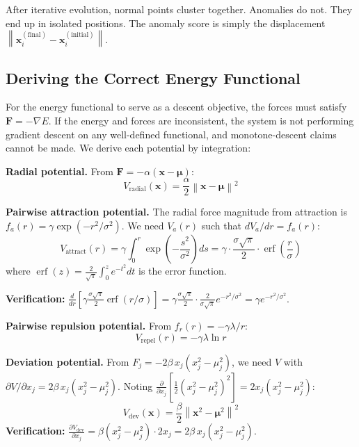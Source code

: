 \documentclass{article}
\newcommand{\norm}[1]{\left\lVert#1\right\rVert}
\DeclareMathOperator{\erf}{erf}
\begin{document}
After iterative evolution, normal points cluster together. Anomalies do not. They end up in isolated positions. The anomaly score is simply the displacement $\norm{\mathbf{x}_i^{(\text{final})} - \mathbf{x}_i^{(\text{initial})}}$.

\subsection{Deriving the Correct Energy Functional}

For the energy functional to serve as a descent objective, the forces must satisfy $\mathbf{F} = -\nabla E$. If the energy and forces are inconsistent, the system is not performing gradient descent on any well-defined functional, and monotone-descent claims cannot be made. We derive each potential by integration:

\textbf{Radial potential.} From $\mathbf{F} = -\alpha(\mathbf{x} - \bm{\mu})$:
\begin{equation}
V_{\text{radial}}(\mathbf{x}) = \frac{\alpha}{2}\norm{\mathbf{x} - \bm{\mu}}^2
\label{eq:v_radial}
\end{equation}

\textbf{Pairwise attraction potential.} The radial force magnitude from attraction is $f_a(r) = \gamma\exp(-r^2/\sigma^2)$. We need $V_a(r)$ such that $dV_a/dr = f_a(r)$:
\begin{equation}
V_{\text{attract}}(r) = \gamma \int_0^r \exp\!\left(-\frac{s^2}{\sigma^2}\right) ds = \gamma \cdot \frac{\sigma\sqrt{\pi}}{2} \cdot \erf\!\left(\frac{r}{\sigma}\right)
\label{eq:v_attract}
\end{equation}
where $\erf(z) = \frac{2}{\sqrt{\pi}}\int_0^z e^{-t^2} dt$ is the error function.

\textbf{Verification:} $\frac{d}{dr}\!\left[\gamma\frac{\sigma\sqrt{\pi}}{2}\erf(r/\sigma)\right] = \gamma\frac{\sigma\sqrt{\pi}}{2} \cdot \frac{2}{\sigma\sqrt{\pi}} e^{-r^2/\sigma^2} = \gamma e^{-r^2/\sigma^2}$. \checkmark

\textbf{Pairwise repulsion potential.} From $f_r(r) = -\gamma\lambda/r$:
\begin{equation}
V_{\text{repel}}(r) = -\gamma\lambda \ln r
\label{eq:v_repel}
\end{equation}

\textbf{Deviation potential.} From $F_j = -2\beta\, x_j(x_j^2 - \mu_j^2)$, we need $V$ with $\partial V/\partial x_j = 2\beta\, x_j(x_j^2 - \mu_j^2)$. Noting $\frac{\partial}{\partial x_j}\!\left[\frac{1}{2}(x_j^2 - \mu_j^2)^2\right] = 2x_j(x_j^2 - \mu_j^2)$:
\begin{equation}
V_{\text{dev}}(\mathbf{x}) = \frac{\beta}{2}\norm{\mathbf{x}^2 - \bm{\mu}^2}^2
\label{eq:v_dev}
\end{equation}
\textbf{Verification:} $\frac{\partial V_{\text{dev}}}{\partial x_j} = \beta(x_j^2 - \mu_j^2) \cdot 2x_j = 2\beta\, x_j(x_j^2 - \mu_j^2)$. \checkmark
\end{document}
